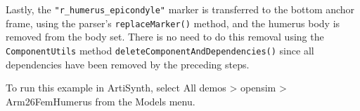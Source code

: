 Lastly, the {\tt "r\_humerus\_epicondyle"} marker is transferred to the bottom
anchor frame, using the parser's {\tt replaceMarker()} method, and the humerus
body is removed from the body set. There is no need to do this removal using
the {\tt ComponentUtils} method {\tt deleteComponentAndDependencies()} since
all dependencies have been removed by the preceding steps.

To run this example in ArtiSynth, select {\sf All demos > opensim >
Arm26FemHumerus} from the {\sf Models} menu.

\ifdefined\maindoc
\else

\fi
